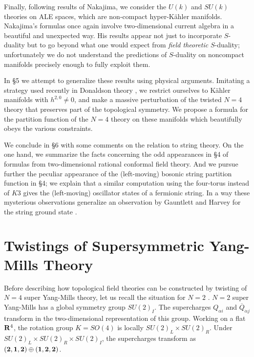 \documentclass[12pt]{article}
\numberwithin{equation}{section}
\def\tilde{\widetilde}
\def\bar{\overline}
\begin{document}
Finally, following results of Nakajima,
we consider the $U(k)$ and $SU(k)$
theories on ALE spaces, which are non-compact hyper-K\"ahler manifolds.
Nakajima's formulas once again involve two-dimensional current algebra
in a beautiful and unexpected way.  His results appear not just
to incorporate $S$-duality but to go beyond what one would
expect from {\it field theoretic} $S$-duality; unfortunately
we do not understand the predictions of $S$-duality
on noncompact manifolds precisely enough to fully exploit them.

In \S5 we attempt to generalize these results using physical
arguments.
Imitating a strategy used recently in Donaldson theory
\cite{switten}, we restrict ourselves to K\"ahler
manifolds
with $h^{2,0}\not=0$, and make a massive perturbation of the
twisted $N=4$ theory that preserves part of the topological symmetry.
We propose a formula for the partition function of the $N=4$ theory on
these manifolds which beautifully obeys the various constraints.

We conclude
in \S6 with some comments on the relation to string theory.
On the one hand, we summarize the facts concerning the odd appearances  in
\S4 of
formulas from two-dimensional rational conformal field theory.
And we
pursue further the peculiar appearance of the (left-moving)
bosonic string partition
function in \S4; we explain that
a similar computation using the four-torus
instead of $K3$ gives the (left-moving) oscillator states of a fermionic
string.   In a way these mysterious observations generalize an observation by
Gauntlett and Harvey for the string ground state
\cite{harre}.

\def\tilde{\widetilde}
\def\bar{\overline}

\section{Twistings of Supersymmetric Yang-Mills Theory}

Before describing how topological field theories can be constructed
by twisting of $N=4$ super Yang-Mills theory, let us recall the situation
for $N=2$ \cite{tqft}.  $N=2$ super Yang-Mills
has a global symmetry group $SU(2)_I$.  The supercharges $Q_{\alpha i}$
and $\bar Q_{\dot\alpha j}$ transform in the two-dimensional representation
of this group.  Working on a flat ${\bf R}^4$, the rotation group
$K=SO(4)$ is locally $SU(2)_L\times SU(2)_R$.  Under $SU(2)_L\times SU(2)_R
\times SU(2)_I$, the supercharges transform as $({\bf 2},{\bf 1},{\bf 2})
\oplus ({\bf 1},{\bf 2},{\bf 2})$.
\end{document}
